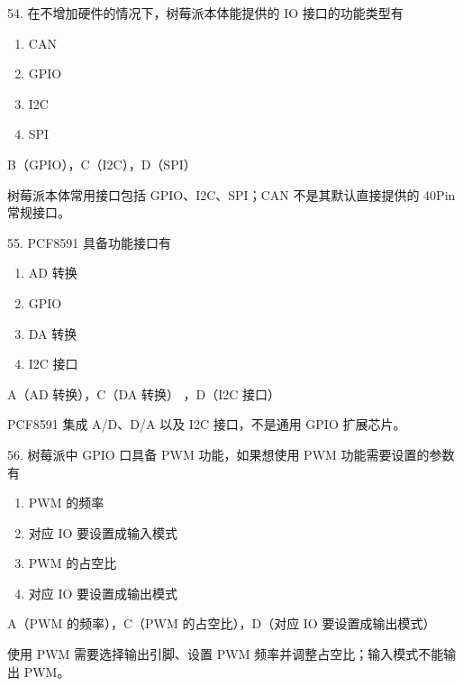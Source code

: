\begin{question}{54. 在不增加硬件的情况下，树莓派本体能提供的 IO 接口的功能类型有}
\begin{enumerate}[label=\Alph*., leftmargin=2.4em, itemsep=0.2em]
\item CAN
\item GPIO
\item I2C
\item SPI
\end{enumerate}
\end{question}
\begin{answer}
B（GPIO），C（I2C），D（SPI）
\end{answer}
\begin{explanation}
树莓派本体常用接口包括 GPIO、I2C、SPI；CAN 不是其默认直接提供的 40Pin 常规接口。
\end{explanation}

\begin{question}{55. PCF8591 具备功能接口有}
\begin{enumerate}[label=\Alph*., leftmargin=2.4em, itemsep=0.2em]
\item AD 转换
\item GPIO
\item DA 转换
\item I2C 接口
\end{enumerate}
\end{question}
\begin{answer}
A（AD 转换），C（DA 转换） ，D（I2C 接口）
\end{answer}
\begin{explanation}
PCF8591 集成 A/D、D/A 以及 I2C 接口，不是通用 GPIO 扩展芯片。
\end{explanation}

\begin{question}{56. 树莓派中 GPIO 口具备 PWM 功能，如果想使用 PWM 功能需要设置的参数有}
\begin{enumerate}[label=\Alph*., leftmargin=2.4em, itemsep=0.2em]
\item PWM 的频率
\item 对应 IO 要设置成输入模式
\item PWM 的占空比
\item 对应 IO 要设置成输出模式
\end{enumerate}
\end{question}
\begin{answer}
A（PWM 的频率），C（PWM 的占空比），D（对应 IO 要设置成输出模式）
\end{answer}
\begin{explanation}
使用 PWM 需要选择输出引脚、设置 PWM 频率并调整占空比；输入模式不能输出 PWM。
\end{explanation}

